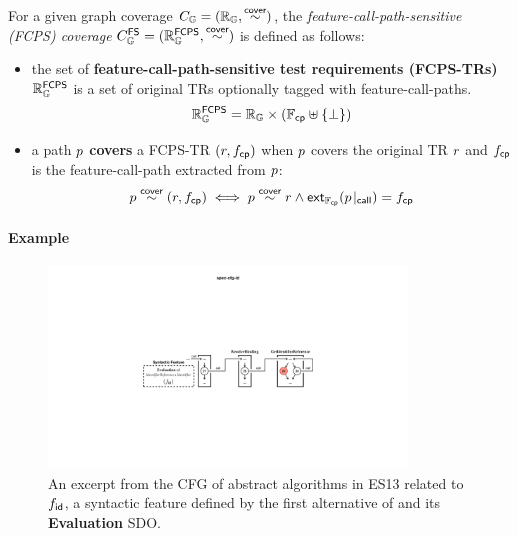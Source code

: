 
\begin{definition}\label{def:fcps-cov}
  For a given graph coverage $C_{\mathbb{G}} = (\mathbb{R}_{\mathbb{G}}, \overset{\textsf{cover}}{\sim})$, the
  \textit{feature-call-path-sensitive (FCPS) coverage} $C_{\mathbb{G}}^{\textsf{FS}} =
  (\mathbb{R}_{\mathbb{G}}^{\textsf{FCPS}}, \overset{\textsf{cover}}{\sim})$ is defined as follows:
  \begin{itemize}
    \item the set of \textbf{feature-call-path-sensitive test requirements
      (FCPS-TRs)} $\mathbb{R}_{\mathbb{G}}^{\textsf{FCPS}}$ is a set of original TRs optionally tagged
      with feature-call-paths.
      \[
        \mathbb{R}_{\mathbb{G}}^{\textsf{FCPS}} = \mathbb{R}_{\mathbb{G}} \times (\mathbb{F}_{\textsf{cp}} \uplus \{ \bot \})
      \]
    \item a path $p$ \textbf{covers} a FCPS-TR $(r, f_{\textsf{cp}})$ when $p$
      covers the original TR $r$ and $f_{\textsf{cp}}$ is the feature-call-path extracted
      from $p$:
      \[
        p \overset{\textsf{cover}}{\sim} (r, f_{\textsf{cp}}) \iff p \overset{\textsf{cover}}{\sim} r \wedge
        \textsf{ext}_{\mathbb{F}_{\textsf{cp}}}({p}\!\mid_{\textsf{call}}) = f_{\textsf{cp}}
      \]
  \end{itemize}
\end{definition}


\paragraph{\textbf{Example}}

\begin{figure}
  \includegraphics[width=0.85\textwidth]{img/spec-cfg-id}
  \caption{
    An excerpt from the CFG of abstract algorithms in ES13 related to $f_{\textsf{id}}$,
    a syntactic feature defined by the first alternative of
     and its \textbf{Evaluation} SDO.
  }
  \label{fig:spec-cfg-id}
\end{figure}

